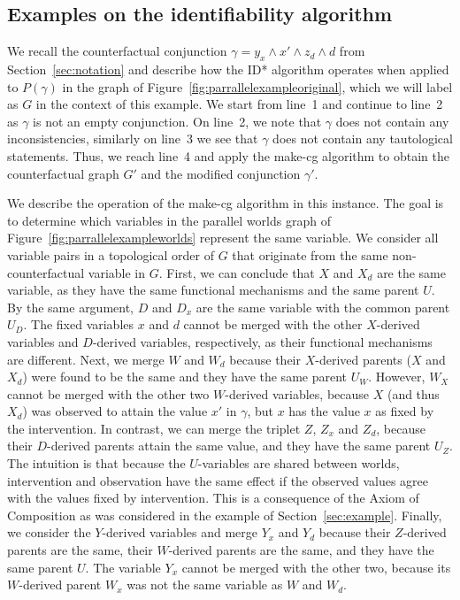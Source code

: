 \subsection{Examples on the identifiability algorithm} \label{sec:id_examples}

We recall the counterfactual conjunction \(\gamma = y_x \wedge x' \wedge z_d \wedge d\) from Section~\ref{sec:notation} and describe how the ID* algorithm operates when applied to \(P(\gamma)\) in the graph of Figure~\ref{fig:parrallelexampleoriginal}, which we will label as \(G\) in the context of this example. We start from line~1 and continue to line~2 as \(\gamma\) is not an empty conjunction. On line~2, we note that \(\gamma\) does not contain any inconsistencies, similarly on line~3 we see that \(\gamma\) does not contain any tautological statements. Thus, we reach line~4 and apply the make-cg algorithm to obtain the counterfactual graph \(G'\) and the modified conjunction \(\gamma'\).

We describe the operation of the make-cg algorithm in this instance. The goal is to determine which variables in the parallel worlds graph of Figure~\ref{fig:parrallelexampleworlds} represent the same variable. We consider all variable pairs in a topological order of \(G\) that originate from the same non-counterfactual variable in \(G\). First, we can conclude that \(X\) and \(X_d\) are the same variable, as they have the same functional mechanisms and the same parent \(U\). By the same argument, \(D\) and \(D_x\) are the same variable with the common parent \(U_D\). The fixed variables \(x\) and \(d\) cannot be merged with the other \(X\)-derived variables and \(D\)-derived variables, respectively, as their functional mechanisms are different. Next, we merge \(W\) and \(W_d\) because their \(X\)-derived parents (\(X\) and \(X_d\)) were found to be the same and they have the same parent \(U_W\). However, \(W_X\) cannot be merged with the other two \(W\)-derived variables, because \(X\) (and thus \(X_d\)) was observed to attain the value \(x'\) in \(\gamma\), but \(x\) has the value \(x\) as fixed by the intervention. In contrast, we can merge the triplet \(Z\), \(Z_x\) and \(Z_d\), because their \(D\)-derived parents attain the same value, and they have the same parent \(U_Z\). The intuition is that because the \(U\)-variables are shared between worlds, intervention and observation have the same effect if the observed values agree with the values fixed by intervention. This is a consequence of the Axiom of Composition as was considered in the example of Section~\ref{sec:example}. Finally, we consider the \(Y\)-derived variables and merge \(Y_x\) and \(Y_d\) because their \(Z\)-derived parents are the same, their \(W\)-derived parents are the same, and they have the same parent \(U\). The variable \(Y_x\) cannot be merged with the other two, because its \(W\)-derived parent \(W_x\) was not the same variable as \(W\) and \(W_d\). 

